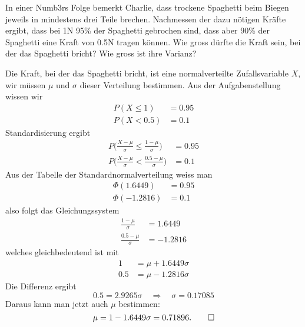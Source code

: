 In einer Numb3rs Folge bemerkt Charlie, dass trockene Spaghetti beim
Biegen jeweils
in mindestens drei Teile brechen. Nachmessen der dazu nötigen Kräfte
ergibt, dass bei 1N 95\% der Spaghetti gebrochen sind, dass aber 90\%
der Spaghetti eine Kraft von 0.5N tragen können. Wie gross dürfte
die Kraft sein, bei der das Spaghetti bricht? Wie gross ist ihre Varianz?


\begin{loesung}
Die Kraft, bei der das Spaghetti bricht, ist eine normalverteilte
Zufallsvariable $X$, wir müssen $\mu$ und $\sigma$ dieser Verteilung
bestimmen. Aus der Aufgabenstellung wissen wir
\begin{align*}
P(X \le 1)&=0.95\\
P(X < 0.5)&=0.1
\end{align*}
Standardisierung ergibt
\begin{align*}
P\biggl(\frac{X-\mu}{\sigma} \le \frac{1-\mu}{\sigma}\biggr)&=0.95\\
P\biggl(\frac{X-\mu}{\sigma} < \frac{0.5-\mu}{\sigma}\biggr)&=0.1
\end{align*}
Aus der Tabelle der Standardnormalverteilung weiss man
\begin{align*}
\Phi(1.6449)&=0.95\\
\Phi(-1.2816)&=0.1
\end{align*}
also folgt das Gleichungssystem
\begin{align*}
\frac{1-\mu}{\sigma}&=1.6449\\
\frac{0.5-\mu}{\sigma}&=-1.2816
\end{align*}
welches gleichbedeutend ist mit
\begin{align*}
1&=\mu+1.6449\sigma\\
0.5&=\mu-1.2816\sigma
\end{align*}
Die Differenz ergibt
\[
0.5 = 2.9265\sigma\quad\Rightarrow\quad \sigma = 0.17085
\]
Daraus kann man jetzt auch $\mu$ bestimmen:
\[
\mu = 1-1.6449\sigma =  0.71896.
\qedhere
\]
\end{loesung}


